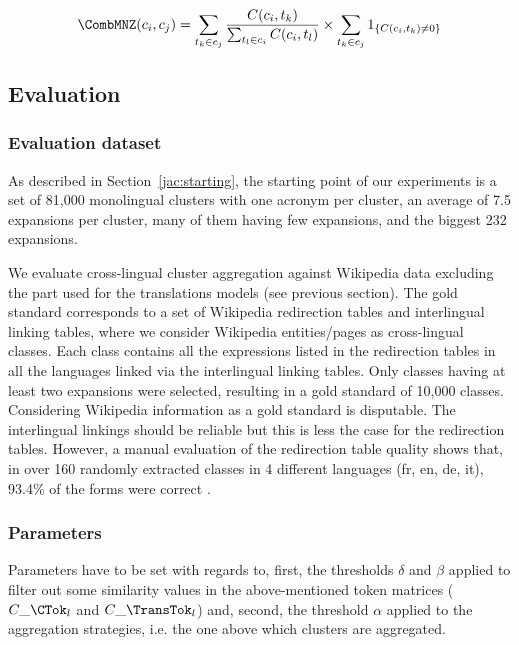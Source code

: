 \documentclass[output=paper]{langsci/langscibook}
\begin{document}
\begin{equation}
\CombMNZ(c_i,c_j) = \sum_{t_k\in c_j} \frac{C(c_i,t_k)}{\sum_{t_l\in
    c_i} C(c_i,t_l)} \times \sum_{t_k\in c_j} 1_{\{C(c_i,t_k)\neq0\}}
\end{equation}


\subsection{Evaluation}
\label{jac:evaluation}
\subsubsection{Evaluation dataset}
\label{jac:evalData}

As described in Section~\ref{jac:starting}, the starting point of our
experiments is a set of 81,000 monolingual clusters with one acronym
per cluster, an average of 7.5 expansions per cluster, many of them
having few expansions, and the biggest 232 expansions.

We evaluate cross-lingual cluster aggregation against Wikipedia data
excluding the part used for the translations models (see previous
section).  The gold standard corresponds to a set of Wikipedia
redirection tables and interlingual linking tables, where we consider
Wikipedia entities/pages as cross-lingual classes.  Each class
contains all the expressions listed in the redirection tables in all
the languages linked via the interlingual linking tables. Only classes
having at least two expansions were selected, resulting in a gold
standard of 10,000 classes.  Considering Wikipedia information as a
gold standard is disputable.  The interlingual linkings should be
reliable but this is less the case for the redirection
tables. However, a manual evaluation of the redirection table quality
shows that, in over 160 randomly extracted classes in 4 different
languages (fr, en, de, it), 93.4\% of the forms were correct
\citep{jacquet-14}.

\subsubsection{Parameters}
\label{jac:settings}

Parameters have to be set with regards to, first, the thresholds
$\delta$ and $\beta$ applied to filter out some similarity values in
the above-mentioned token matrices ($C\_\CTok_{l}$ and $C\_\TransTok_{l}$) and, second,
the threshold $\alpha$ applied to the aggregation strategies, i.e. the
one above which clusters are aggregated.
\end{document}
